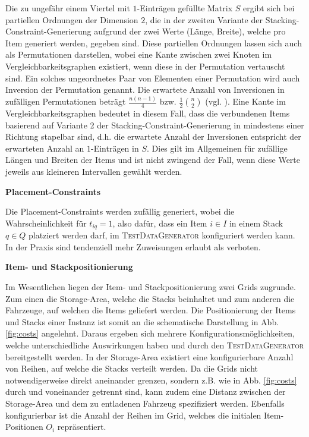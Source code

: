 Die zu ungefähr einem Viertel mit $1$-Einträgen gefüllte Matrix $S$ ergibt sich bei partiellen Ordnungen der Dimension $2$,
die in der zweiten Variante der Stacking-Constraint-Generierung aufgrund der zwei Werte (Länge, Breite),
welche pro Item generiert werden, gegeben sind.
Diese partiellen Ordnungen lassen sich auch als Permutationen darstellen, wobei eine Kante zwischen
zwei Knoten im Vergleichbarkeitsgraphen existiert, wenn diese in der Permutation
vertauscht sind. Ein solches ungeordnetes Paar von Elementen einer Permutation wird auch Inversion
der Permutation genannt. Die erwartete Anzahl von Inversionen in zufälligen Permutationen
beträgt $\frac{n (n - 1)}{4}$ bzw. $\frac{1}{2} \binom{n}{2}$ (vgl. \citet{Heuberger2012}).
Eine Kante im Vergleichbarkeitsgraphen bedeutet in diesem Fall, dass die verbundenen Items
basierend auf Variante 2 der Stacking-Constraint-Generierung in mindestens einer Richtung stapelbar sind,
d.h. die erwartete Anzahl der Inversionen entspricht der erwarteten Anzahl an $1$-Einträgen in $S$.
Dies gilt im Allgemeinen für zufällige Längen und Breiten der Items und ist nicht zwingend der Fall,
wenn diese Werte jeweils aus kleineren Intervallen gewählt werden.

\textbf{Placement-Constraints}

Die Placement-Constraints werden zufällig generiert, wobei die Wahrscheinlichkeit für $t_{iq} = 1$, also dafür,
dass ein Item $i \in I$ in einem Stack $q \in Q$ platziert werden darf, im \textsc{TestDataGenerator} konfiguriert werden kann.
In der Praxis sind tendenziell mehr Zuweisungen erlaubt als verboten.

\textbf{Item- und Stackpositionierung}

Im Wesentlichen liegen der Item- und Stackpositionierung zwei Grids zugrunde. Zum einen die Storage-Area,
welche die Stacks beinhaltet und zum anderen die Fahrzeuge, auf welchen die Items geliefert werden.
Die Positionierung der Items und Stacks einer Instanz ist somit an die schematische Darstellung in Abb. \ref{fig:costs}
angelehnt. Daraus ergeben sich mehrere Konfigurationsmöglichkeiten, welche unterschiedliche Auswirkungen haben
und durch den \textsc{TestDataGenerator} bereitgestellt werden.
In der Storage-Area existiert eine konfigurierbare Anzahl von Reihen, auf welche die Stacks verteilt werden.
Da die Grids nicht notwendigerweise direkt aneinander grenzen, sondern z.B. wie in Abb. \ref{fig:costs}
durch  und  voneinander getrennt sind, kann zudem eine Distanz
zwischen der Storage-Area und dem zu entladenen Fahrzeug spezifiziert werden.
Ebenfalls konfigurierbar ist die Anzahl der Reihen im Grid, welches die initialen Item-Positionen $O_i$ repräsentiert.

